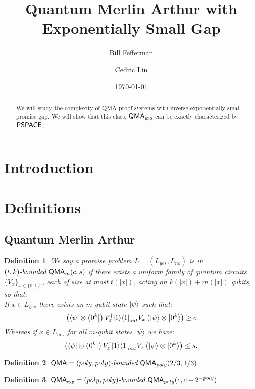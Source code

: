 \documentclass[11pt]{article}
\newtheorem{definition}{Definition}
\theoremstyle{definition}
\theoremstyle{remark}
\newcommand\QMA{{\sf{QMA}}}
\newcommand\PSPACE{{\sf{PSPACE}}}
\newcommand\QMAexp{{\sf{QMA}_{exp}}}
\newcommand\bddQMA[5]{{\left(#1,#2\right)}\textit{-bounded }\QMA_{#3}(#4,#5)}
\begin{document}
\title{Quantum Merlin Arthur with Exponentially Small Gap}
\author[1]{Bill Fefferman}
\author[1]{Cedric Lin}
\date{\today}

\maketitle

\begin{abstract}
We will study the complexity of QMA proof systems with inverse exponentially small promise gap.  We will show that this class, $\QMAexp$ can be exactly characterized by $\PSPACE$.
\end{abstract}

\section{Introduction}
\section{Definitions}

\subsection{Quantum Merlin Arthur}\label{def:qma}
\begin{definition}We say a promise problem $L=(L_{yes},L_{no})$ is in $\bddQMA{t}{k}{m}{c}{s}$ if there exists a uniform family of quantum circuits $\{ V_x\}_{x\in\{0,1\}^n}$, each of size at most $t(|x|)$, acting on $k(|x|)+m(|x|)$ qubits, so that:\\

If $x \in L_{yes}$ there exists an $m$-qubit state ${\left\vert{\psi}\right\rangle}$ such that:
\begin{equation}
\left({\left\langle{\psi}\right\vert}\otimes {\left\langle{0^k}\right\vert}\right) V^\dagger_x {\left\vert{1}\right\rangle}{\left\langle{1}\right\vert}_{out} V_x \left({\left\vert{\psi}\right\rangle}\otimes {\left\vert{0^k}\right\rangle}\right) \ge c
\end{equation}
Whereas if $x \in L_{no}$, for all $m$-qubit states ${\left\vert{\psi}\right\rangle}$ we have:
\begin{equation}
\left({\left\langle{\psi}\right\vert}\otimes {\left\langle{0^k}\right\vert}\right) V^\dagger_x {\left\vert{1}\right\rangle}{\left\langle{1}\right\vert}_{out} V_x \left({\left\vert{\psi}\right\rangle}\otimes {\left\vert{0^k}\right\rangle}\right) \le s.
\end{equation}

  \end{definition}

\begin{definition} $\QMA=\bddQMA{poly}{poly}{poly}{2/3}{1/3}$\end{definition}
\begin{definition} $\QMAexp=\bddQMA{poly}{poly}{poly}{c}{c-2^{-poly}}$	
\end{definition}
\end{document}
